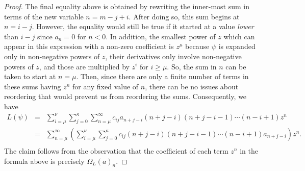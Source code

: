 \documentclass[10pt,a4paper]{amsart}
\def\dmax{\kappa}
\def\zmax{\nu}
\def\zmin{\mu}
\begin{document}
\begin{proof}
The final equality above is obtained by rewriting the inner-most sum
in terms of the new variable $n=m-j+i$.
After doing so, this sum begins at $n=i-j$.  However, the equality would
still be true if it started at a value \textit{lower} than $i-j$ since
$a_n=0$ for $n<0$.  In addition, the smallest power of $z$ which can
appear in this expression with a non-zero coefficient is $z^{\zmin}$
because $\psi$ is expanded only in non-negative powers of $z$, their
derivatives only involve non-negative powers of $z$, and those are
multiplied by $z^i$ for $i\geq \zmin$.  So, the sum in $n$ can be
taken to start at $n=\zmin$.  Then, since there are only a finite
number of terms in these sums having $z^n$ for any fixed value of $n$,
there can be no issues about reordering that would prevent us from
reordering the sums.
Consequently, we have
\begin{eqnarray*}
L(\psi)& =&\sum_{i=\zmin}^{\zmax}\sum_{j=0}^{\dmax}\sum_{n=\zmin}^\infty c_{ij}a_{n+j-i}
      (n+j-i)(n+j-i-1)\cdots(n-i+1)z^{n}\\
&=&\sum_{n=\zmin}^{\infty}\left(
\sum_{i=\zmin}^{\zmax}\sum_{j=0}^{\dmax} 
c_{ij}(n+j-i)(n+j-i-1)\cdots(n-i+1)a_{n+j-i}\right)z^{n}.\\
\end{eqnarray*}
The claim follows from the observation that the coefficient of each
term $z^n$
in the formula above is precisely $\Omega_L(a)_n$.
\end{proof}
\end{document}
